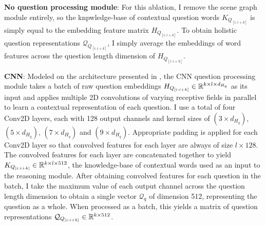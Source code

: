 \textbf{No question processing module}: For this ablation, I remove the scene graph module entirely, so the knpwledge-base of contextual question words \(K_{Q_{[i:i+k]}}\) is simply equal to the embedding feature matrix \(H_{Q_{[i:i+k]}}\). To obtain holistic question representations \(\mathcal{Q}_{Q_{[i:i+k]}}\), I simply average the embeddings of word features across the question length dimension of \(H_{Q_{[i:i+k]}}\).

\textbf{CNN}: Modeled on the architecture presented in \cite{kim2014convolutional}, the CNN question processing module takes a batch of raw question embeddings \(H_{Q_{[i:i+k]}} \in \mathbb{R}^{k \times l \times d_{H_q}}\) as its input and applies multiple 2D convolutions of varying receptive fields in parallel to learn a contextual representation of each question. I use a total of four Conv2D layers, each with 128 output channels and kernel sizes of \((3 \times d_{H_q})\), \((5 \times d_{H_q})\), \((7 \times d_{H_q})\) and \((9 \times d_{H_q})\). Appropriate padding is applied for each Conv2D layer so that convolved features for each layer are always of size \(l \times 128\). The convolved features for each layer are concatenated together to yield \(K_{Q_{[i:i+k]}} \in \mathbb{R}^{k \times l \times 512}\), the knowledge-base of contextual words used as an input to the reasoning module. After obtaining convolved features for each question in the batch, I take the maximum value of each output channel across the question length dimension to obtain a single vector \(\mathcal{Q}_q\) of dimension 512, representing the question as a whole. When processed as a batch, this yields a matrix of question representations \(\mathcal{Q}_{Q_{[i:i+k]} } \in \mathbb{R}^{k \times 512}\).

